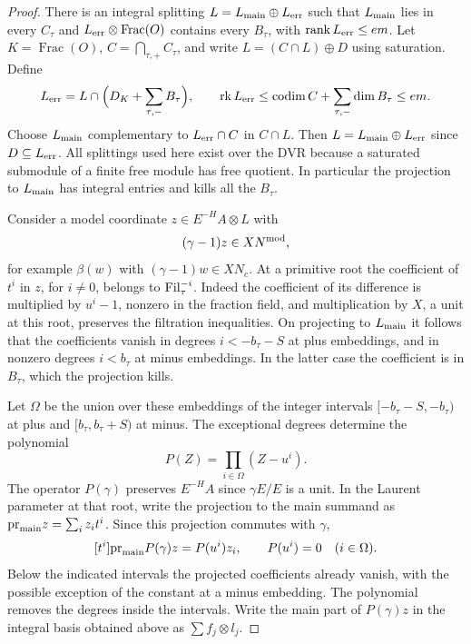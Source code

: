 \begin{proof}
There is an integral splitting \(L=L_{\rm main}\oplus L_{\rm err}\)
such that \(L_{\rm main}\) lies in every \(C_\tau\) and
\(L_{\rm err}\otimes{\rm Frac}(O)\) contains every \(B_\tau\), with
\({\rm rank}\,L_{\rm err}\le em\). Let \(K=\operatorname{Frac}(O)\), \(C=\bigcap_{\tau,+}C_\tau\),
and write \(L=(C\cap L)\oplus D\) using saturation. Define
\[
  L_{\rm err}=L\cap\Big(D_K+\sum_{\tau,-}B_\tau\Big),
  \qquad
  \operatorname{rk}L_{\rm err}\le \operatorname{codim} C
                          +\sum_{\tau,-}\dim B_\tau\le em .
\]
Choose \(L_{\rm main}\) complementary to \(L_{\rm err}\cap C\)
in \(C\cap L\). Then \(L=L_{\rm main}\oplus L_{\rm err}\)
since \(D\subseteq L_{\rm err}\). All splittings used here exist over the DVR because
a saturated submodule of a finite free module has free quotient.
In particular the projection to \(L_{\rm main}\) has integral entries
and kills all the \(B_\tau\).

Consider a model coordinate \(z\in E^{-H}A\otimes L\) with
\[
 (\gamma-1)z\in XN^{\rm mod},
\]
for example \(\beta(w)\) with \((\gamma-1)w\in XN_c\). At a primitive root the coefficient of
\(t^i\) in \(z\), for \(i\ne0\), belongs to \({\rm Fil}^{-i}_\tau\).
Indeed the coefficient of its difference is multiplied by \(u^i-1\),
nonzero in the fraction field, and multiplication by \(X\), a unit
at this root, preserves the filtration inequalities. On projecting
to \(L_{\rm main}\) it follows that the coefficients vanish in degrees
\(i<-b_\tau-S\) at plus embeddings, and in nonzero degrees
\(i<b_\tau\) at minus embeddings. In the latter case the coefficient
is in \(B_\tau\), which the projection kills.

Let \(\Omega\) be the union over these embeddings of the integer
intervals \([-b_\tau-S,-b_\tau)\) at plus and
\([b_\tau,b_\tau+S)\) at minus. The exceptional degrees determine the polynomial
\[
 P(Z)=\prod_{i\in\Omega}(Z-u^i).
\]
The operator \(P(\gamma)\) preserves \(E^{-H}A\) since \(\gamma E/E\)
is a unit. In the Laurent parameter at that root, write the projection
to the main summand as \({\rm pr}_{\rm main}z=\sum_i z_i t^i\).
Since this projection commutes with \(\gamma\),
\[
 [t^i]{\rm pr}_{\rm main}P(\gamma)z=P(u^i)z_i,\qquad
 P(u^i)=0\quad(i\in\Omega).
\]
Below the indicated intervals the projected coefficients already vanish,
with the possible exception of the constant at a minus embedding.
The polynomial removes the degrees inside the intervals. Write the main part of \(P(\gamma)z\) in the integral
basis obtained above as \(\sum f_j\otimes l_j\).


\end{proof}
